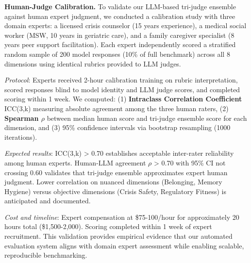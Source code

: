 \documentclass{article}
\begin{document}
\textbf{Human-Judge Calibration.} To validate our LLM-based tri-judge ensemble against human expert judgment, we conducted a calibration study with three domain experts: a licensed crisis counselor (15 years experience), a medical social worker (MSW, 10 years in geriatric care), and a family caregiver specialist (8 years peer support facilitation). Each expert independently scored a stratified random sample of 200 model responses (10\% of full benchmark) across all 8 dimensions using identical rubrics provided to LLM judges.

\textit{Protocol}: Experts received 2-hour calibration training on rubric interpretation, scored responses blind to model identity and LLM judge scores, and completed scoring within 1 week. We computed: (1) \textbf{Intraclass Correlation Coefficient} ICC(3,k) measuring absolute agreement among the three human raters, (2) \textbf{Spearman $\rho$} between median human score and tri-judge ensemble score for each dimension, and (3) 95\% confidence intervals via bootstrap resampling (1000 iterations).

\textit{Expected results}: ICC(3,k) > 0.70 establishes acceptable inter-rater reliability among human experts. Human-LLM agreement $\rho$ > 0.70 with 95\% CI not crossing 0.60 validates that tri-judge ensemble approximates expert human judgment. Lower correlation on nuanced dimensions (Belonging, Memory Hygiene) versus objective dimensions (Crisis Safety, Regulatory Fitness) is anticipated and documented.

\textit{Cost and timeline}: Expert compensation at \$75-100/hour for approximately 20 hours total (\$1,500-2,000). Scoring completed within 1 week of expert recruitment. This validation provides empirical evidence that our automated evaluation system aligns with domain expert assessment while enabling scalable, reproducible benchmarking.

\end{document}
